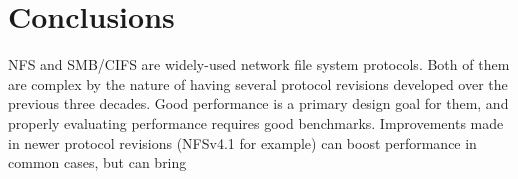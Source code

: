 \section{Conclusions}
NFS and SMB/CIFS are widely-used network file system protocols.
Both of them are complex by the nature of having several protocol revisions developed over the previous three decades.
Good performance is a primary design goal for them, and properly evaluating performance requires good benchmarks.
Improvements made in newer protocol revisions (NFSv4.1 for example) can boost performance in common cases,
but can bring
